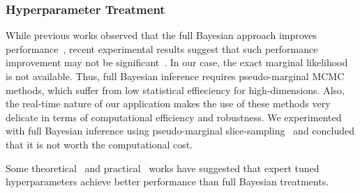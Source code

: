\subsubsection{Hyperparameter Treatment}
While previous works observed that the full Bayesian approach improves performance~\cite{henrandez-lobato_predictive_2014, snoek_practical_2012}, recent experimental results suggest that such performance improvement may not be significant~\cite{ath_bayesian_2021}.
In our case, the exact marginal likelihood is not available.
Thus, full Bayesian inference requires pseudo-marginal MCMC~\cite{filippone_pseudomarginal_2014, pmlr-v51-murray16} methods, which suffer from low statistical effieciency for high-dimensions.
Also, the real-time nature of our application makes the use of these methods very delicate in terms of computational efficiency and robustness.
We experimented with full Bayesian inference using pseudo-marginal slice-sampling~\cite{pmlr-v51-murray16} and concluded that it is not worth the computational cost.

Some theoretical~\cite{berkenkamp_noregret_2019} and practical~\cite{wang_adaptive_2013} works have suggested that expert tuned hyperparameters achieve better performance than full Bayesian treatments.





